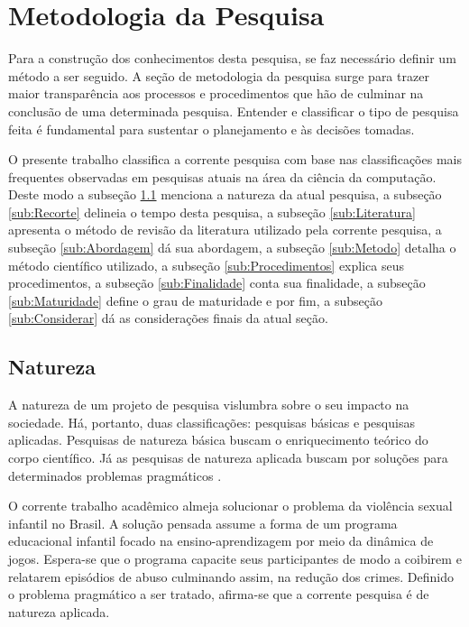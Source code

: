 \newpage
\section{Metodologia da Pesquisa}\label{sec:Metodologia}

Para a construção dos conhecimentos desta pesquisa, se faz necessário definir um método a ser seguido. A seção de metodologia da pesquisa surge para trazer maior transparência aos processos e procedimentos que hão de culminar na conclusão de uma determinada pesquisa. Entender e classificar o tipo de pesquisa feita é fundamental para sustentar o planejamento e às decisões tomadas.

O presente trabalho classifica a corrente pesquisa com base nas classificações mais frequentes observadas em pesquisas atuais na área da ciência da computação. Deste modo a subseção \ref{sub:Natureza} menciona a natureza da atual pesquisa, a subseção \ref{sub:Recorte} delineia o tempo desta pesquisa, a subseção \ref{sub:Literatura} apresenta o método de revisão da literatura utilizado pela corrente pesquisa, a subseção \ref{sub:Abordagem} dá sua abordagem, a subseção \ref{sub:Metodo} detalha o método científico utilizado, a subseção \ref{sub:Procedimentos} explica seus procedimentos, a subseção \ref{sub:Finalidade} conta sua finalidade, a subseção \ref{sub:Maturidade} define o grau de maturidade e por fim, a subseção \ref{sub:Considerar} dá as considerações finais da atual seção. 


\subsection{Natureza}\label{sub:Natureza}

A natureza de um projeto de pesquisa vislumbra sobre o seu impacto na sociedade. Há, portanto, duas classificações: pesquisas básicas e pesquisas aplicadas. Pesquisas de natureza básica buscam o enriquecimento teórico do corpo científico. Já as pesquisas de natureza aplicada buscam por soluções para determinados problemas pragmáticos \cite{zanella2006metodologia}.

O corrente trabalho acadêmico almeja solucionar o problema da violência sexual infantil no Brasil. A solução pensada assume a forma de um programa educacional infantil focado na ensino-aprendizagem por meio da dinâmica de jogos. Espera-se que o programa capacite seus participantes de modo a coibirem e relatarem episódios de abuso culminando assim, na redução dos crimes. Definido o problema pragmático a ser tratado, afirma-se que a corrente pesquisa é de natureza aplicada.

